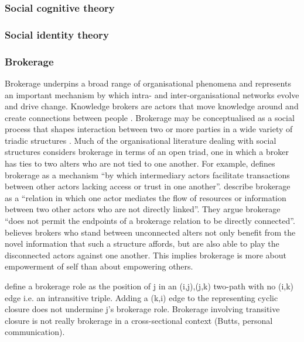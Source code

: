 \subsubsection{Social cognitive theory}


\subsubsection{Social identity theory}

\subsubsection{Brokerage}

Brokerage underpins a broad range of organisational phenomena and represents an important mechanism by which intra- and inter-organisational networks evolve and drive change. Knowledge brokers are actors that move knowledge around and create connections between people \citep{meyer2010rise}. Brokerage may be conceptualised as a social process that shapes interaction between two or more parties in a wide variety of triadic structures \citep{obstfeld2002knowledge}. Much of the organisational literature dealing with social structures considers brokerage in terms of an open triad, one in which a broker has ties to two alters who are not tied to one another. For example, \citet{marsden1982brokerage} defines brokerage as a mechanism \enquote{by which intermediary actors facilitate transactions between other actors lacking access or trust in one another}. \citet{fernandez1994dilemma} describe brokerage as a \enquote{relation in which one actor mediates the flow of resources or information between two other actors who are not directly linked}. They argue brokerage \enquote{does not permit the endpoints of a brokerage relation to be directly connected}. \citet{burt1992structural} believes brokers who stand between unconnected alters not only benefit from the novel information that such a structure affords, but are also able to play the disconnected actors against one another. This implies brokerage is more about empowerment of self than about empowering others. \medskip

\citet{gould1989structures} define a brokerage role as the position of j in an (i,j),(j,k) two-path with no (i,k) edge i.e. an intransitive triple. Adding a (k,i) edge to the representing cyclic closure does not undermine j's brokerage role. Brokerage involving transitive closure is not really brokerage in a cross-sectional context (Butts, personal communication).


